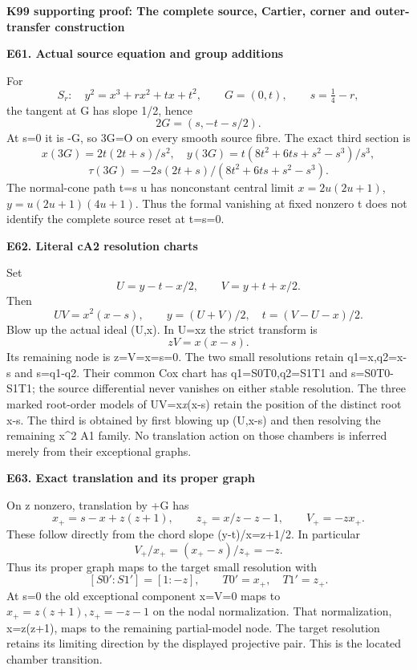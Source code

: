 \par\bigskip\noindent\textbf{K99 supporting proof: The complete source, Cartier, corner and outer-transfer construction}\par\nobreak
\par

\medskip\noindent\textbf{E61. Actual source equation and group additions}

\par\nobreak

For
\[
 S_r:\quad y^2=x^3+r x^2+t x+t^2,\qquad G=(0,t),
 \qquad s=\tfrac14-r,
\]
the tangent at G has slope 1/2, hence
\[
 2G=(s,-t-s/2).
\]
At s=0 it is -G, so 3G=O on every smooth source fibre. The exact
third section is
\[
 x(3G)=2t(2t+s)/s^2,\quad
 y(3G)=t(8t^2+6ts+s^2-s^3)/s^3,
\]
\[
 \tau(3G)=-2s(2t+s)/(8t^2+6ts+s^2-s^3).
\]
The normal-cone path t=s u has nonconstant central limit
\(x=2u(2u+1)\), \(y=u(2u+1)(4u+1)\). Thus the formal vanishing
at fixed nonzero t does not identify the complete source reset at t=s=0.

\par

\medskip\noindent\textbf{E62. Literal cA2 resolution charts}

\par\nobreak

Set
\[
 U=y-t-x/2,\qquad V=y+t+x/2.
\]
Then
\[
 UV=x^2(x-s),\qquad y=(U+V)/2,\quad t=(V-U-x)/2.
\]
Blow up the actual ideal (U,x). In U=xz the strict transform is
\[
 zV=x(x-s).
\]
Its remaining node is z=V=x=s=0. The two small resolutions retain
q1=x,q2=x-s and s=q1-q2. Their common Cox chart has
q1=S0T0,q2=S1T1 and s=S0T0-S1T1; the source differential never
vanishes on either stable resolution. The three marked root-order
models of UV=x\emph{x}(x-s) retain the position of the distinct root x-s.
The third is obtained by first blowing up (U,x-s) and then resolving
the remaining x\^{}2 A1 family. No translation action on those chambers
is inferred merely from their exceptional graphs.

\par

\medskip\noindent\textbf{E63. Exact translation and its proper graph}

\par\nobreak

On z nonzero, translation by +G has
\[
 x_+=s-x+z(z+1),\qquad
 z_+=x/z-z-1,\qquad V_+=-z x_+.
\]
These follow directly from the chord slope (y-t)/x=z+1/2.
In particular
\[
 V_+/x_+=(x_+-s)/z_+=-z.
\]
Thus its proper graph maps to the target small resolution with
\[
 [S0':S1']=[1:-z],\qquad T0'=x_+,\quad T1'=z_+.
\]
At s=0 the old exceptional component x=V=0 maps to
\(x_+=z(z+1),z_+=-z-1\) on the nodal normalization.
That normalization, x=z(z+1), maps to the remaining partial-model
node. The target resolution retains its limiting direction by the
displayed projective pair. This is the located chamber transition.

